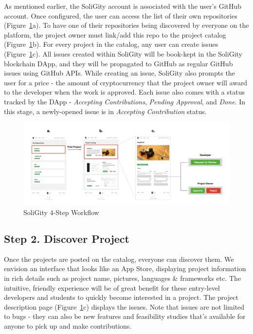 \documentclass[12pt]{article}
\renewcommand{\_}{\kern-1.5pt\textunderscore\kern-1.5pt}
\begin{document}
As mentioned earlier, the SoliGity account is associated with the user’s GitHub account. Once configured, the user can access the list of their own repositories (Figure~\ref{fig:workflow2}a). To have one of their repositories being discovered by everyone on the platform, the project owner must link/add this repo to the project catalog (Figure~\ref{fig:workflow2}b). For every project in the catalog, any user can create issues (Figure~\ref{fig:workflow2}c). All issues created within SoliGity will be book-kept in the SoliGity blockchain DApp, and they will be propagated to GitHub as regular GitHub issues using GitHub APIs. While creating an issue, SoliGity also prompts the user for a price - the amount of cryptocurrency that the project owner will award to the developer when the work is approved. Each issue also comes with a status tracked by the DApp - \textit{Accepting Contributions}, \textit{Pending Approval}, and \textit{Done}. In this stage, a newly-opened issue is in \textit{Accepting Contribution} status.


\begin{figure}[H]
	\centering
	\includegraphics[width=16.5cm]{graphs/00b. workflow.jpeg}
	\caption{SoliGity 4-Step Workflow}
	\label{fig:workflow2}
\end{figure}

\subsection*{Step 2. Discover Project}

Once the projects are posted on the catalog, everyone can discover them. We envision an interface that looks like an App Store, displaying project information in rich details such as project name, pictures, languages \& frameworks etc. The intuitive, friendly experience will be of great benefit for these entry-level developers and students to quickly become interested in a project. The project description page (Figure~\ref{fig:workflow2}c) displays the issues. Note that issues are not limited to bugs - they can also be new features and feasibility studies that’s available for anyone to pick up and make contributions.
\end{document}
